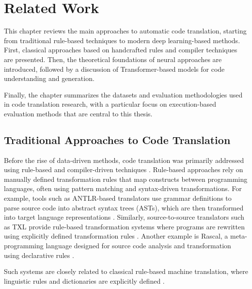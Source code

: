 \chapter{Related Work}
\label{ch:rel_work}

This chapter reviews the main approaches to automatic code translation, starting
from traditional rule-based techniques to modern deep learning-based methods.
First, classical approaches based on handcrafted rules and compiler techniques
are presented. Then, the theoretical foundations of neural approaches are
introduced, followed by a discussion of Transformer-based models for code
understanding and generation.

Finally, the chapter summarizes the datasets and evaluation methodologies used
in code translation research, with a particular focus on execution-based
evaluation methods that are central to this thesis.

\section{Traditional Approaches to Code Translation}


Before the rise of data-driven methods, code translation was primarily addressed
using rule-based and compiler-driven techniques \cite{rule_based_translation,
antlr, transpiler_survey}. Rule-based approaches rely on manually defined
transformation rules that map constructs between programming languages, often
using pattern matching and syntax-driven transformations. For example, tools
such as ANTLR-based translators use grammar definitions to parse source code
into abstract syntax trees (ASTs), which are then transformed into target
language representations \cite{antlr}. Similarly, source-to-source translators
such as TXL provide rule-based transformation systems where programs are
rewritten using explicitly defined transformation rules \cite{txl}. Another
example is Rascal, a meta-programming language designed for source code analysis
and transformation using declarative rules \cite{rascal}.

Such systems are closely related to classical rule-based machine translation,
where linguistic rules and dictionaries are explicitly defined \cite{rbmt}.

